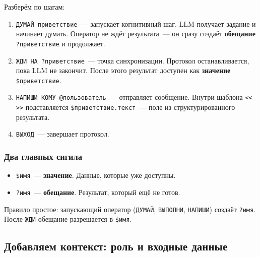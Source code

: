 \documentclass[11pt,a4paper]{article}
\newcommand{\ic}[1]{\texttt{\small #1}}
\begin{document}

Разберём по шагам:

\begin{enumerate}[leftmargin=2em]
\item \ic{ДУМАЙ приветствие}~--- запускает когнитивный шаг. LLM получает задание и начинает думать. Оператор не ждёт результата~--- он сразу создаёт \textbf{обещание} \ic{?приветствие} и продолжает.

\item \ic{ЖДИ НА ?приветствие}~--- точка синхронизации. Протокол останавливается, пока LLM не закончит. После этого результат доступен как \textbf{значение} \ic{\$приветствие}.

\item \ic{НАПИШИ КОМУ @пользователь}~--- отправляет сообщение. Внутри шаблона \ic{<{<} >{>}} подставляется \ic{\$приветствие.текст}~--- поле из структурированного результата.

\item \ic{ВЫХОД}~--- завершает протокол.
\end{enumerate}

\subsubsection{Два главных сигила}

\begin{itemize}[leftmargin=2em]
\item \ic{\$имя}~--- \textbf{значение}. Данные, которые уже доступны.
\item \ic{?имя}~--- \textbf{обещание}. Результат, который ещё не готов.
\end{itemize}

Правило простое: запускающий оператор (\ic{ДУМАЙ}, \ic{ВЫПОЛНИ}, \ic{НАПИШИ}) создаёт \ic{?имя}. После \ic{ЖДИ} обещание разрешается в \ic{\$имя}.

\subsection{Добавляем контекст: роль и входные данные}
\end{document}
